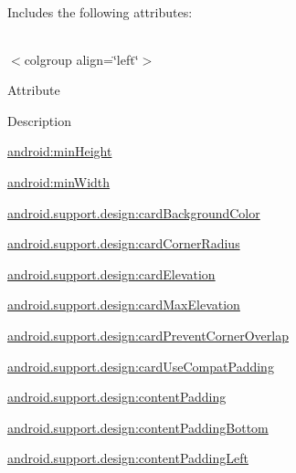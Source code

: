 Includes the following attributes\+:

\tabulinesep=1mm
\begin{longtabu} spread 0pt [c]{*{0}{|X[-1]}|}
\hline
\end{longtabu}
$<$colgroup align=\char`\"{}left\char`\"{}$>$ 

Attribute

Description 

{\ttfamily \hyperlink{classandroid_1_1support_1_1design_1_1R_1_1styleable_aaa46b03e98d9719634ae097f8034a87a}{android\+:min\+Height}}

{\ttfamily \hyperlink{classandroid_1_1support_1_1design_1_1R_1_1styleable_a7cd46aef2821766fc2a2f791147bfa8b}{android\+:min\+Width}}

{\ttfamily \hyperlink{classandroid_1_1support_1_1design_1_1R_1_1styleable_a981ca74979c85ed8524c9ac8a8be63a6}{android.\+support.\+design\+:card\+Background\+Color}}

{\ttfamily \hyperlink{classandroid_1_1support_1_1design_1_1R_1_1styleable_a56013ce0ae69336c7d1e0f3c38902e3f}{android.\+support.\+design\+:card\+Corner\+Radius}}

{\ttfamily \hyperlink{classandroid_1_1support_1_1design_1_1R_1_1styleable_ab1f403337584c00422841622610e14b3}{android.\+support.\+design\+:card\+Elevation}}

{\ttfamily \hyperlink{classandroid_1_1support_1_1design_1_1R_1_1styleable_ab9004c87f60e622b9d923cc5c6a6a276}{android.\+support.\+design\+:card\+Max\+Elevation}}

{\ttfamily \hyperlink{classandroid_1_1support_1_1design_1_1R_1_1styleable_af6467363197508f4dffe4ce79959a4e7}{android.\+support.\+design\+:card\+Prevent\+Corner\+Overlap}}

{\ttfamily \hyperlink{classandroid_1_1support_1_1design_1_1R_1_1styleable_a6d33db49497d7e18a8bf8487f8d988b5}{android.\+support.\+design\+:card\+Use\+Compat\+Padding}}

{\ttfamily \hyperlink{classandroid_1_1support_1_1design_1_1R_1_1styleable_a71511b509dca70524cb9582021ad44a8}{android.\+support.\+design\+:content\+Padding}}

{\ttfamily \hyperlink{classandroid_1_1support_1_1design_1_1R_1_1styleable_aa50ab159eaffa56c7c1179a4bda584fd}{android.\+support.\+design\+:content\+Padding\+Bottom}}

{\ttfamily \hyperlink{classandroid_1_1support_1_1design_1_1R_1_1styleable_a63ea966e86e38f24ab2c64f89934a768}{android.\+support.\+design\+:content\+Padding\+Left}}

